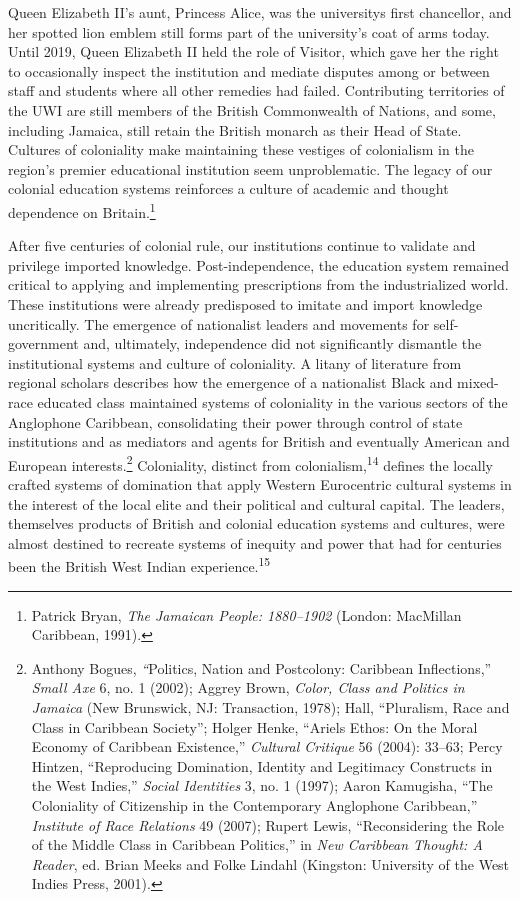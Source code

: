 \documentclass{tufte-handout}
\begin{document}
Queen Elizabeth II's aunt, Princess Alice, was the
university\textquotesingle s first chancellor, and her spotted lion
emblem still forms part of the university's coat of arms today. Until
2019, Queen Elizabeth II held the role of Visitor, which gave her the
right to occasionally inspect the institution and mediate disputes among
or between staff and students where all other remedies had failed.
Contributing territories of the UWI are still members of the British
Commonwealth of Nations, and some, including Jamaica, still retain the
British monarch as their Head of State. Cultures of coloniality make
maintaining these vestiges of colonialism in the region's premier
educational institution seem unproblematic. The legacy of our colonial
education systems reinforces a culture of academic and thought
dependence on Britain.\footnote{Patrick Bryan, \emph{The Jamaican
  People: 1880--1902} (London: MacMillan Caribbean, 1991).}

After five centuries of colonial rule, our institutions continue to
validate and privilege imported knowledge. Post-independence, the
education system remained critical to applying and implementing
prescriptions from the industrialized world. These institutions were
already predisposed to imitate and import knowledge uncritically. The
emergence of nationalist leaders and movements for self-government and,
ultimately, independence did not significantly dismantle the
institutional systems and culture of coloniality. A litany of literature
from regional scholars describes how the emergence of a nationalist
Black and mixed-race educated class maintained systems of coloniality in
the various sectors of the Anglophone Caribbean, consolidating their
power through control of state institutions and as mediators and agents
for British and eventually American and European interests.\footnote{Anthony
  Bogues, \emph{``}Politics, Nation and Postcolony: Caribbean
  Inflections,'' \emph{Small Axe} 6, no. 1 (2002); Aggrey Brown,
  \emph{Color, Class and Politics in Jamaica} (New Brunswick, NJ:
  Transaction, 1978); Hall, ``Pluralism, Race and Class in Caribbean
  Society''; Holger Henke, ``Ariel\textquotesingle s Ethos: On the Moral
  Economy of Caribbean Existence,'' \emph{Cultural Critique} 56 (2004):
  33--63; Percy Hintzen, ``Reproducing Domination, Identity and
  Legitimacy Constructs in the West Indies,'' \emph{Social Identities}
  3, no. 1 (1997); Aaron Kamugisha, ``The Coloniality of Citizenship in
  the Contemporary Anglophone Caribbean,'' \emph{Institute of Race
  Relations} 49 (2007); Rupert Lewis, ``Reconsidering the Role of the
  Middle Class in Caribbean Politics,'' in \emph{New Caribbean Thought:
  A Reader}, ed. Brian Meeks and Folke Lindahl (Kingston: University of
  the West Indies Press, 2001).} Coloniality, distinct from
colonialism,\textsuperscript{14} defines the locally
crafted systems of domination that apply Western Eurocentric cultural
systems in the interest of the local elite and their political and
cultural capital. The leaders, themselves products of British and
colonial education systems and cultures, were almost destined to
recreate systems of inequity and power that had for centuries been the
British West Indian experience.\textsuperscript{15}
\end{document}
